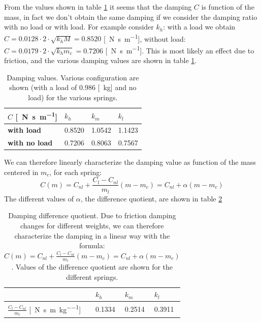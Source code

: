 From the values shown in table \ref{table: cart_detached_damping} it seems that the damping $C$ is function of the mass, in fact we don't obtain the same damping if we consider the damping ratio with no load or with load. For example consider $k_h$: with a load we obtain $C= 0.0128\cdot2\cdot\sqrt{k_h M}=0.8520$ [\SI{}{\newton \second \per \metre}], without load: $C=0.0179\cdot2\cdot\sqrt{k_h m_c}=0.7206$ [\SI{}{\newton \second \per \metre}]. This is most likely an effect due to friction, and the various damping values are shown in table 
\ref{table: cart_detached_damping}.
\begin{table}[!h]
\centering
\label{table: cart_detached_damping}
\begin{tabular}{|l|l|l|l|}
\hline
{$C$ [\SI{}{\newton \second \per \metre}]} & \textbf{$k_h$} & \textbf{$k_m$}   & \textbf{$k_l$}   \\ \hline
\textbf{with load}         &0.8520    & 1.0542 & 1.1423 \\ \hline
\textbf{with no load}     &0.7206    & 0.8063 & 0.7567      \\ \hline
\end{tabular}
\caption{Damping values. Various configuration are shown (with a load of $0.986$ [\SI{}{\kilo \gram}] and no load) for the various springs. }
\end{table}

We can therefore linearly characterize the damping value as function of the mass centered in $m_c$, for each spring:
$$C(m)=C_{nl}+ \frac{C_{l}-C_{nl}}{m_{l}}(m -m_{c}) = C_{nl} +\alpha (m-m_{c})$$
The different values of $\alpha$, the difference quotient, are shown in table \ref{table: cart_detached_damping_quotient}

\begin{table}[!h]
\centering
\label{table: cart_detached_damping_quotient}
\begin{tabular}{|l|l|l|l|}
\hline
 & \textbf{$k_h$} & \textbf{$k_m$}   & \textbf{$k_l$}   \\ \hline
$\frac{C_{l}-C_{nl}}{m_{l}}$ [\SI{}{\newton \second \per \metre \per \kilo\gram}]       &0.1334   & 0.2514 & 0.3911 \\ \hline
\end{tabular}
\caption{Damping difference quotient. Due to friction damping changes for different weights, we can therefore characterize the damping in a linear way with the formula: $C(m)=C_{nl}+ \frac{C_{l}-C_{nl}}{m_{l}}(m -m_{c})= C_{nl} +\alpha (m-m_{c})$. Values of the difference quotient are shown for the different springs.}
\end{table}


